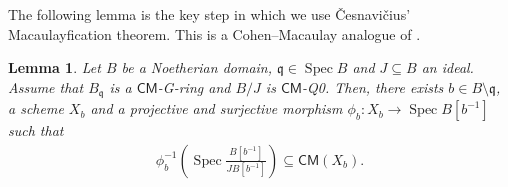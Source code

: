 \documentclass[a4paper, 11pt]{amsart}
\newtheorem{lemma}[theorem]{Lemma}
\theoremstyle{definition}
\newcommand{\Spec}{\operatorname{Spec}}
\let\subset\subseteq
\begin{document}
The following lemma is the key step in which we use \v{C}esnavi\v{c}ius' Macaulayfication theorem. This is a Cohen--Macaulay analogue of \cite[Lemma~4.4]{KS21}.

\begin{lemma}\label{lem:lem1-3}
    Let $B$ be a Noetherian domain, $\mathfrak{q} \in \Spec B$ and $J \subset B$ an ideal. Assume that $B_\mathfrak{q}$ is a $\mathsf{CM}$\textnormal{-G-}ring and $B/J$ is $\mathsf{CM}$\textnormal{-Q0}. Then, there exists $b \in B \setminus \mathfrak{q}$, a scheme $X_b$ and a projective and surjective morphism $\phi_b \colon X_b \to \Spec B[b^{-1}]$ such that
    \begin{align*}
        \phi_b^{-1}\left( \Spec \frac{B[b^{-1}]}{JB[b^{-1}]} \right) \subset \mathsf{CM}(X_b).
    \end{align*}
\end{lemma}
\end{document}
